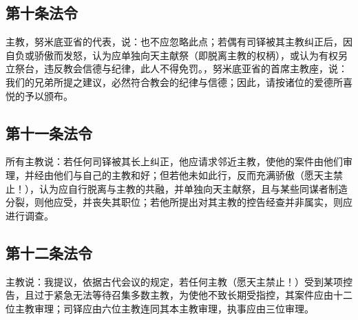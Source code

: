 
\subsection{第十条法令}

\par

主教，努米底亚省的代表，说：也不应忽略此点；若偶有司铎被其主教纠正后，因自负或骄傲而发怒，认为应单独向天主献祭（即脱离主教的权柄），或认为有权另立祭台，违反教会信德与纪律，此人不得免罚。，努米底亚省的首席主教座，说：我们的兄弟所提之建议，必然符合教会的纪律与信德；因此，请按诸位的爱德所喜悦的予以颁布。\par


\subsection{第十一条法令}

\par

所有主教说：若任何司铎被其长上纠正，他应请求邻近主教，使他的案件由他们审理，并经由他们与自己的主教和好；但若他未如此行，反而充满骄傲（愿天主禁止！），认为应自行脱离与主教的共融，并单独向天主献祭，且与某些同谋者制造分裂，则他应受，并丧失其职位；若他所提出对其主教的控告经查并非属实，则应进行调查。\par


\subsection{第十二条法令}

\par

主教说：我提议，依据古代会议的规定，若任何主教（愿天主禁止！）受到某项控告，且过于紧急无法等待召集多数主教，为使他不致长期受指控，其案件应由十二位主教审理；司铎应由六位主教连同其本主教审理，执事应由三位审理。\par

